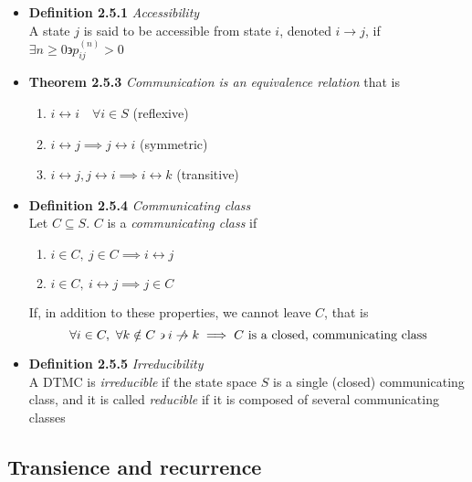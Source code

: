 \documentclass[11pt,a4paper]{article}
\begin{document}
\begin{itemize}

    \item \textbf{Definition 2.5.1} \emph{Accessibility} \\
        A state $j$ is said to be accessible from state $i$, denoted $i \rightarrow j$, if
        $\exists n \geq 0 \backepsilon p_{ij}^{(n)} > 0$

    \item \textbf{Theorem 2.5.3} \emph{Communication is an equivalence relation}
        that is
        \begin{enumerate}
            \item $i \leftrightarrow i \quad \forall i \in S$ (reflexive)
            \item $i \leftrightarrow j \implies j \leftrightarrow i$ (symmetric)
            \item $i \leftrightarrow j, j \leftrightarrow i \implies i \leftrightarrow k$
                (transitive)
        \end{enumerate}

    \item \textbf{Definition 2.5.4} \emph{Communicating class} \\
        Let $C \subseteq S$. $C$ is a \emph{communicating class} if
        \begin{enumerate}
            \item $i \in C,\ j \in C \implies i \leftrightarrow j$
            \item $i \in C,\ i \leftrightarrow j \implies j \in C$
        \end{enumerate}
        If, in addition to these properties, we cannot leave $C$, that is
        \[
            \forall i \in C,\ \forall k \notin C \backepsilon i \centernot\rightarrow k
            \implies C \text{ is a closed, communicating class}
        \]

    \item \textbf{Definition 2.5.5} \emph{Irreducibility} \\
        A DTMC is \emph{irreducible} if the state space $S$ is a single (closed)
        communicating class, and it is called \emph{reducible} if it is composed of several
        communicating classes

\end{itemize}

\subsection{Transience and recurrence}
\end{document}
